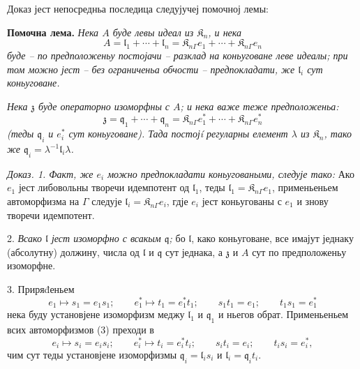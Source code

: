 \documentclass[11pt]{article}
\begin{document}
Доказ јест непосредньа последица следујучеј помочној лемы:

\textbf{Помочна лема.} \emph{Нека \(A\) буде левы идеал из \(\mathfrak K_n\), и нека}
\[
A=\mathfrak l_1+\cdots+\mathfrak l_n
=\mathfrak K_{n\Gamma}e_1+\cdots+\mathfrak K_{n\Gamma}e_n
\]
\emph{буде -- по предположеньу постојачи -- разклад на коньуговане леве идеалы; при том можно јест -- без ограниченьа обчости -- предпокладати, же \(\mathfrak l_i\) сут коньуговане.}

\emph{Нека \(\mathfrak z\) буде операторно изоморфны с \(A\); и нека важе теже предположеньа:}
\[
\mathfrak z=\mathfrak q_1+\cdots+\mathfrak q_n
=\mathfrak K_{n\Gamma}e_1^*+\cdots+\mathfrak K_{n\Gamma}e_n^*
\]
\emph{(теды \(\mathfrak q_i\) и \(e_i^*\) сут коньуговане). Тада постојí регуларны елемент \(\lambda\) из \(\mathfrak K_n\), тако же \(\mathfrak q_i=\lambda^{-1}\mathfrak l_i\lambda\).}

\emph{Доказ. 1. Факт, же \(e_i\) можно предпокладати коньуговаными, следује тако:} Ако \(e_1\) јест либовольны творечи идемпотент од \(\mathfrak l_1\), теды \(\mathfrak l_1=\mathfrak K_{n\Gamma}e_1\), применьеньем автоморфизма на \(\Gamma\) следује \(\mathfrak l_i=\mathfrak K_{n\Gamma}e_i\), гдје \(e_i\) јест коньугованы с \(e_1\) и знову творечи идемпотент.

2. \emph{Всако \(\mathfrak l\) јест изоморфно с всакым \(\mathfrak q\);} бо \(\mathfrak l\), како коньуговане, все имајут једнаку (абсолутну) должину, числа од \(\mathfrak l\) и \(\mathfrak q\) сут једнака, а \(\mathfrak z\) и \(A\) сут по предположеньу изоморфне.

3. Приряđеньем
\[
\tag{3}
e_1\mapsto s_1=e_1s_1;\qquad
e_1^*\mapsto t_1=e_1^*t_1;\qquad
s_1t_1=e_1;\qquad
t_1s_1=e_1^*
\]
нека буду установјене изоморфизм меджу \(\mathfrak l_1\) и \(\mathfrak q_1\) и ньегов обрат. Применьеньем всих автоморфизмов (3) преходи в
\[
e_i\mapsto s_i=e_is_i;\qquad
e_i^*\mapsto t_i=e_i^*t_i;\qquad
s_it_i=e_i;\qquad
t_is_i=e_i^*,
\]
чим сут теды установјене изоморфизмы \(\mathfrak q_i=\mathfrak l_is_i\) и \(\mathfrak l_i=\mathfrak q_it_i\).
\end{document}
